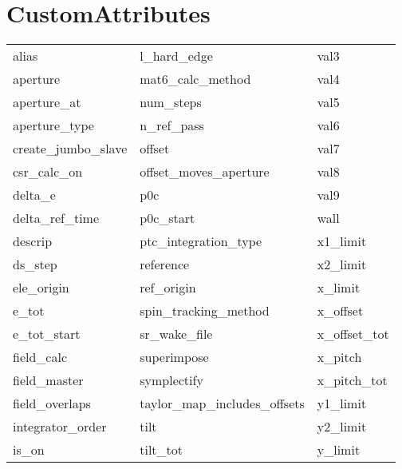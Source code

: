  \section{CustomAttributes}
 \label{s:list.custom}
 
 \begin{tabular}{lll} \toprule
alias                       & l_hard_edge                 & val3                        \\
aperture                    & mat6_calc_method            & val4                        \\
aperture_at                 & num_steps                   & val5                        \\
aperture_type               & n_ref_pass                  & val6                        \\
create_jumbo_slave          & offset                      & val7                        \\
csr_calc_on                 & offset_moves_aperture       & val8                        \\
delta_e                     & p0c                         & val9                        \\
delta_ref_time              & p0c_start                   & wall                        \\
descrip                     & ptc_integration_type        & x1_limit                    \\
ds_step                     & reference                   & x2_limit                    \\
ele_origin                  & ref_origin                  & x_limit                     \\
e_tot                       & spin_tracking_method        & x_offset                    \\
e_tot_start                 & sr_wake_file                & x_offset_tot                \\
field_calc                  & superimpose                 & x_pitch                     \\
field_master                & symplectify                 & x_pitch_tot                 \\
field_overlaps              & taylor_map_includes_offsets & y1_limit                    \\
integrator_order            & tilt                        & y2_limit                    \\
is_on                       & tilt_tot                    & y_limit                     \\

\end{tabular}
